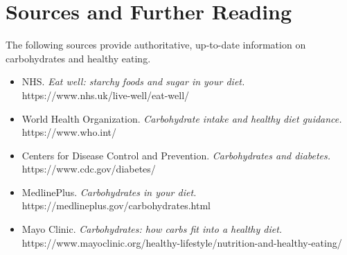 \section*{Sources and Further Reading}
The following sources provide authoritative, up-to-date information on carbohydrates and healthy eating.
\begin{itemize}
    \item NHS. \textit{Eat well: starchy foods and sugar in your diet.} https://www.nhs.uk/live-well/eat-well/
    \item World Health Organization. \textit{Carbohydrate intake and healthy diet guidance.} https://www.who.int/
    \item Centers for Disease Control and Prevention. \textit{Carbohydrates and diabetes.} https://www.cdc.gov/diabetes/
    \item MedlinePlus. \textit{Carbohydrates in your diet.} https://medlineplus.gov/carbohydrates.html
    \item Mayo Clinic. \textit{Carbohydrates: how carbs fit into a healthy diet.} https://www.mayoclinic.org/healthy-lifestyle/nutrition-and-healthy-eating/
\end{itemize}
